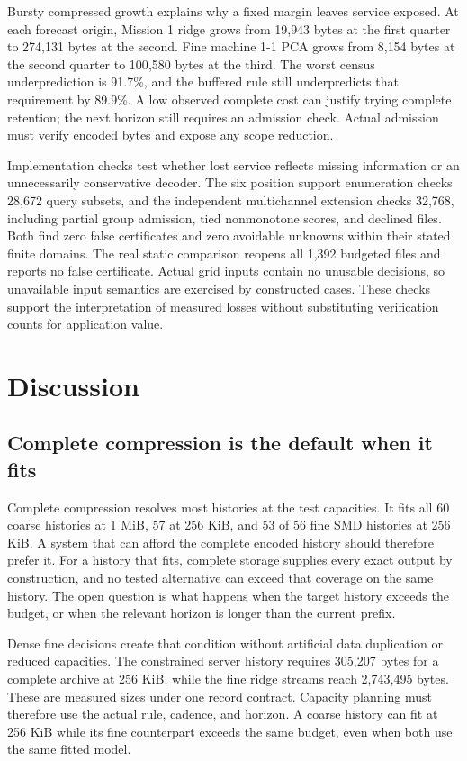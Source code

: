 \documentclass[a4paper,fleqn]{cas-dc}
\begin{document}
Bursty compressed growth explains why a fixed margin leaves service exposed. At each forecast origin, Mission 1 ridge grows from 19{,}943 bytes at the first quarter to 274{,}131 bytes at the second. Fine machine 1-1 PCA grows from 8{,}154 bytes at the second quarter to 100{,}580 bytes at the third. The worst census underprediction is 91.7\%, and the buffered rule still underpredicts that requirement by 89.9\%. A low observed complete cost can justify trying complete retention; the next horizon still requires an admission check. Actual admission must verify encoded bytes and expose any scope reduction.

Implementation checks test whether lost service reflects missing information or an unnecessarily conservative decoder. The six position support enumeration checks 28{,}672 query subsets, and the independent multichannel extension checks 32{,}768, including partial group admission, tied nonmonotone scores, and declined files. Both find zero false certificates and zero avoidable unknowns within their stated finite domains. The real static comparison reopens all 1{,}392 budgeted files and reports no false certificate. Actual grid inputs contain no unusable decisions, so unavailable input semantics are exercised by constructed cases. These checks support the interpretation of measured losses without substituting verification counts for application value.

\section{Discussion}\label{sec:discussion}

\subsection{Complete compression is the default when it fits}

Complete compression resolves most histories at the test capacities. It fits all 60 coarse histories at 1 MiB, 57 at 256 KiB, and 53 of 56 fine SMD histories at 256 KiB. A system that can afford the complete encoded history should therefore prefer it. For a history that fits, complete storage supplies every exact output by construction, and no tested alternative can exceed that coverage on the same history. The open question is what happens when the target history exceeds the budget, or when the relevant horizon is longer than the current prefix.

Dense fine decisions create that condition without artificial data duplication or reduced capacities. The constrained server history requires 305{,}207 bytes for a complete archive at 256 KiB, while the fine ridge streams reach 2{,}743{,}495 bytes. These are measured sizes under one record contract. Capacity planning must therefore use the actual rule, cadence, and horizon. A coarse history can fit at 256 KiB while its fine counterpart exceeds the same budget, even when both use the same fitted model.
\end{document}
